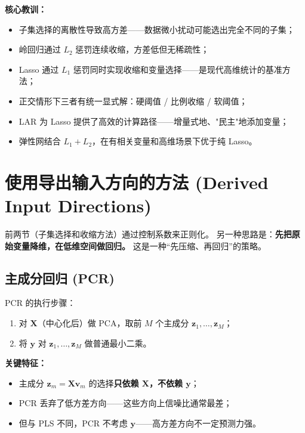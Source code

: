 \textbf{核心教训：}
\begin{itemize}
    \item 子集选择的离散性导致高方差——数据微小扰动可能选出完全不同的子集；
    \item 岭回归通过 $L_2$ 惩罚连续收缩，方差低但无稀疏性；
    \item Lasso 通过 $L_1$ 惩罚同时实现收缩和变量选择——是现代高维统计的基准方法；
    \item 正交情形下三者有统一显式解：硬阈值 / 比例收缩 / 软阈值；
    \item LAR 为 Lasso 提供了高效的计算路径——增量式地、"民主"地添加变量；
    \item 弹性网结合 $L_1+L_2$，在有相关变量和高维场景下优于纯 Lasso。
\end{itemize}

\section{使用导出输入方向的方法 (Derived Input Directions)}

前两节（子集选择和收缩方法）通过控制系数来正则化。
另一种思路是：\textbf{先把原始变量降维，在低维空间做回归。}
这是一种``先压缩、再回归''的策略。

\subsection{主成分回归 (PCR)}

\begin{definition}[主成分回归]
PCR 的执行步骤：
\begin{enumerate}[label=第 \arabic* 步：, leftmargin=*]
    \item 对 $\mathbf{X}$（中心化后）做 PCA，取前 $M$ 个主成分 $\mathbf{z}_1, \dots, \mathbf{z}_M$；
    \item 将 $\mathbf{y}$ 对 $\mathbf{z}_1, \dots, \mathbf{z}_M$ 做普通最小二乘。
\end{enumerate}
\end{definition}

\textbf{关键特征：}
\begin{itemize}
    \item 主成分 $\mathbf{z}_m = \mathbf{X}\mathbf{v}_m$ 的选择\textbf{只依赖 $\mathbf{X}$，不依赖 $\mathbf{y}$}；
    \item PCR 丢弃了低方差方向——这些方向上信噪比通常最差；
    \item 但与 PLS 不同，PCR 不考虑 $\mathbf{y}$——高方差方向不一定预测力强。
\end{itemize}

